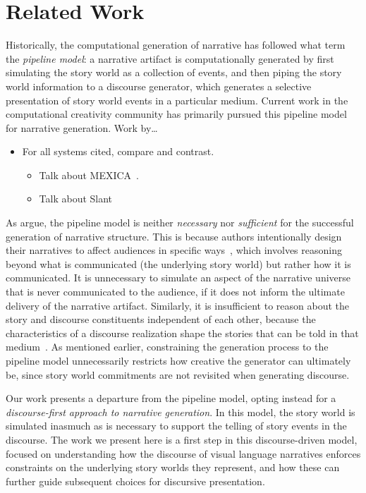 \section{Related Work}

Historically, the computational generation of narrative has followed what
 term the \emph{pipeline model}: a narrative artifact is
computationally generated by first simulating the story world as a collection of
events, and then piping the story world information to a discourse generator,
which generates a selective presentation of story world events in a particular
medium. Current work in the computational creativity community has primarily
pursued this pipeline model for narrative generation. Work by\ldots




\begin{itemize}

	\item For all systems cited, compare and contrast. 
	\begin{itemize} 
		\item Talk about MEXICA~\cite{perez2001mexica}. 
		\item Talk about Slant~\cite{} 
	\end{itemize}

\end{itemize}

As \citeauthor{ronfard2014story} argue, the pipeline model is neither
\emph{necessary} nor \emph{sufficient} for the successful generation of
narrative structure. This is because authors intentionally design their
narratives to affect audiences in specific
ways~\cite{chatman1980story,bordwell1989making}, which involves reasoning beyond
what is communicated (the underlying story world) but rather how it is
communicated. It is unnecessary to simulate an aspect of the narrative universe
that is never communicated to the audience, if it does not inform the ultimate
delivery of the narrative artifact. Similarly, it is insufficient to reason
about the story and discourse constituents independent of each other, because
the characteristics of a discourse realization shape the stories that can be
told in that medium~\cite{herman2004toward}. As mentioned earlier, constraining
the generation process to the pipeline model unnecessarily restricts how
creative the generator can ultimately be, since story world commitments are not
revisited when generating discourse.

Our work presents a departure from the pipeline model, opting instead for a
\emph{discourse-first approach to narrative generation}. In this model, the
story world is simulated inasmuch as is necessary to support the telling of
story events in the discourse. The work we present here is a first step in this
discourse-driven model, focused on understanding how the discourse of visual
language narratives enforces constraints on the underlying story worlds they
represent, and how these can further guide subsequent choices for discursive
presentation.



